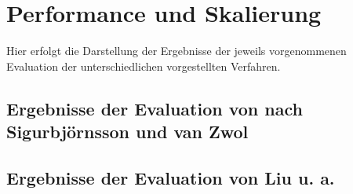 \section{Performance und Skalierung} %
\label{sec:performance_und_skalierung}
Hier erfolgt die Darstellung der Ergebnisse der jeweils vorgenommenen Evaluation der unterschiedlichen vorgestellten Verfahren.

\subsection{Ergebnisse der Evaluation von nach Sigurbjörnsson und van Zwol} %
\label{sub:ergebnisse_der_evaluation_von_collectiveknowledge}


\subsection{Ergebnisse der Evaluation von Liu u. a.} %
\label{sub:ergebnisse_der_evaluation_von_}


